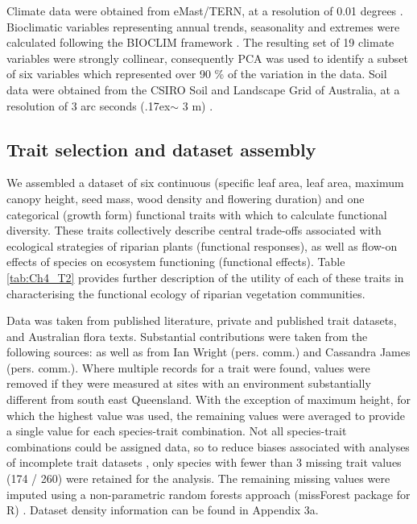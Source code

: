 \documentclass[openright,12pt,a4paper]{memoir}
\begin{document}
Climate data were obtained from eMast/TERN, at a resolution of 0.01 degrees \citep{Hutchinson2014}. Bioclimatic variables representing annual trends, seasonality and extremes were calculated following the BIOCLIM framework \citep{busby1991bioclim}. The resulting set of 19 climate variables were strongly collinear, consequently PCA was used to identify a subset of six variables which represented over 90 \% of the variation in the data. Soil data were obtained from the CSIRO Soil and Landscape Grid of Australia, at a resolution of 3 arc seconds ({\raise.17ex\hbox{$\scriptstyle\mathtt{\sim}$}} 3 m) \citep{Rossel2014, Rossel2014a, Rossel2014b, Rossel2014c, Rossel2014d, Rossel2014e, Rossel2014f, Rossel2014g, Rossel2014h, Rossel2014i, Rossel2014j, Wilford2014}.

\subsection{Trait selection and dataset assembly}
We assembled a dataset of six continuous (specific leaf area, leaf area, maximum canopy height, seed mass, wood density and flowering duration) and one categorical (growth form) functional traits with which to calculate functional diversity. These traits collectively describe central trade-offs associated with ecological strategies of riparian plants (functional responses), as well as flow-on effects of species on ecosystem functioning (functional effects). Table \ref{tab:Ch4_T2} provides further description of the utility of each of these traits in characterising the functional ecology of riparian vegetation communities.

Data was taken from published literature, private and published trait datasets, and Australian flora texts. Substantial contributions were taken from the following sources: \citep{KEWseed, plantnet, zanne2009global, Wright2000, Fonseca2000, Gallagher2012a, Kooyman2013, Gleason2012} as well as from Ian Wright (pers. comm.) and Cassandra James (pers. comm.). Where multiple records for a trait were found, values were removed if they were measured at sites with an environment substantially different from south east Queensland. With the exception of maximum height, for which the highest value was used, the remaining values were averaged to provide a single value for each species-trait combination. Not all species-trait combinations could be assigned data, so to reduce biases associated with analyses of incomplete trait datasets \citep{Penone2014}, only species with fewer than 3 missing trait values (174 / 260) were retained for the analysis. The remaining missing values were imputed using a non-parametric random forests approach (missForest package for R) \citep{Stekhoven2012}. Dataset density information can be found in Appendix 3a.
\end{document}
